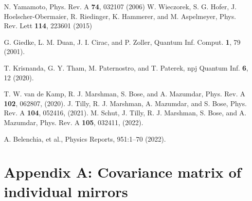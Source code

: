 \documentclass[twocolumn,superscriptaddress,aps,preprintnumbers,amsmath,amssymb,prl,nofootinbib]{revtex4}
\begin{document}
\begin{thebibliography}{}
N. Yamamoto,
Phys. Rev. A {\bf 74}, 032107 (2006)
W. Wieczorek, S. G. Hofer, J. Hoelscher-Obermaier, R. Riedinger, K. Hammerer, and M. Aspelmeyer, 
Phys. Rev. Lett {\bf 114}, 223601 (2015)

G. Giedke, L. M. Duan, J. I. Cirac, and P. Zoller, Quantum
Inf. Comput. {\bf 1}, 79 (2001).


T. Krisnanda, G. Y. Tham, M. Paternostro, and T. Paterek,
npj Quantum Inf. {\bf 6}, 12 (2020).



T. W. van de Kamp, R. J. Marshman, S. Bose, and A. Mazumdar,
Phys. Rev. A {\bf 102}, 062807, (2020).
J. Tilly, R. J. Marshman, A. Mazumdar, and S. Bose,
Phys. Rev. A {\bf 104}, 052416, (2021).
M. Schut, J. Tilly, R. J. Marshman, S. Bose, and A. Mazumdar,
Phys. Rev. A {\bf 105}, 032411, (2022).

A. Belenchia, et al.,
Physics Reports, 951:1–70 (2022).




\end{thebibliography}

\onecolumngrid

\section{Appendix A: Covariance matrix of individual mirrors}
\end{document}
